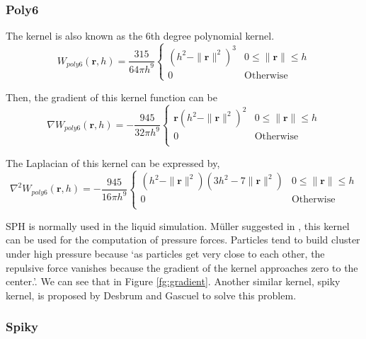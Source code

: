     \subsubsection{Poly6}
    \label{poly6}
    The kernel is also known as the 6th degree polynomial kernel.
    \begin{equation}
        W_{poly 6}(\textbf{r}, h) = \frac{315}{64\pi h^{9}}
            \begin{cases}
                (h^2 - \|\textbf{r}\|^2)^3 & 0 \le \|\textbf{r}\| \le h \\
                0 & \textrm{Otherwise}
            \end{cases}
    \end{equation}

    Then, the gradient of this kernel function can be
    \begin{equation}
        \nabla W_{poly 6}(\textbf{r}, h) = - \frac{945}{32\pi h^9}
            \begin{cases}
                \textbf{r}(h^2 - \|\textbf{r}\|^2)^2 & 0\le\|\textbf{r}\|\le h \\
                0 & \textrm{Otherwise}\\
            \end{cases}
    \end{equation}

    The Laplacian of this kernel can be expressed by, 
    \begin{equation}
        \nabla^2 W_{poly6}(\textbf{r}, h) = - \frac{945}{16\pi h^9}
            \begin{cases}
                (h^2 - \|\textbf{r}\|^2)(3h^2-7\|\textbf{r}\|^2) & 0\le\|\textbf{r}\|\le h \\
                0 & \textrm{Otherwise}\\
            \end{cases}
    \end{equation}

    SPH is normally used in the liquid simulation. M\"uller suggested in \cite{muller2003particle}, this kernel can be used for the computation of pressure forces. Particles tend to build cluster under high pressure because `as particles get very close to each other, the repulsive force vanishes because the gradient of the kernel approaches zero to the center.'. We can see that in Figure \ref{fg:gradient}. Another similar kernel, spiky kernel, is proposed by Desbrum and Gascuel\cite{desbrun1996smoothed} to solve this problem.

    \subsubsection{Spiky}

